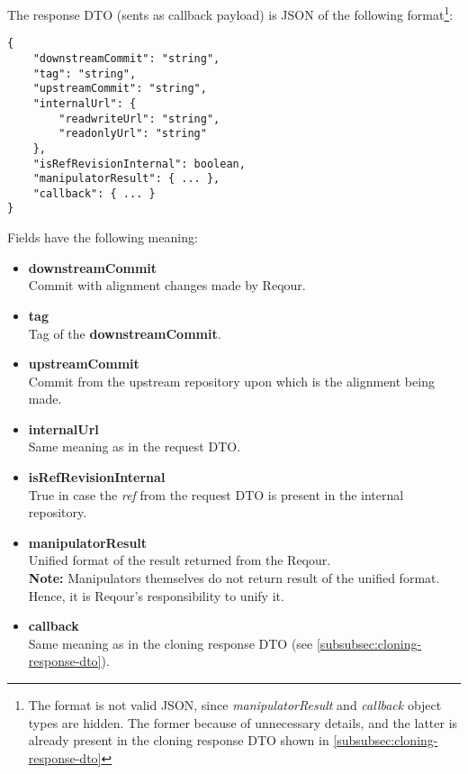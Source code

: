\documentclass[../main.tex]{subfiles}
\begin{document}
The response DTO (sents as callback payload) is JSON of the following format\footnote{The format is not valid JSON, since \textit{manipulatorResult} and \textit{callback} object types are hidden. The former because of unnecessary details, and the latter is already present in the cloning response DTO shown in \ref{subsubsec:cloning-response-dto}}:

\begin{lstlisting}[numbers=none]
{
    "downstreamCommit": "string",
    "tag": "string",
    "upstreamCommit": "string",
    "internalUrl": {
        "readwriteUrl": "string",
        "readonlyUrl": "string"
    },
    "isRefRevisionInternal": boolean,
    "manipulatorResult": { ... },
    "callback": { ... }
}
\end{lstlisting}

Fields have the following meaning:
\begin{itemize}
    \item \textbf{downstreamCommit}\\
    Commit with alignment changes made by Reqour.

    \item \textbf{tag}\\
    Tag of the \textbf{downstreamCommit}.

    \item \textbf{upstreamCommit}\\
    Commit from the upstream repository upon which is the alignment being made.
    
    \item \textbf{internalUrl}\\
    Same meaning as in the request DTO.

    \item \textbf{isRefRevisionInternal}\\
    True in case the \textit{ref} from the request DTO is present in the internal repository.

    \item \textbf{manipulatorResult}\\
    Unified format of the result returned from the Reqour.\\
    \textbf{Note:} Manipulators themselves do not return result of the unified format. Hence, it is Reqour's responsibility to unify it.

    \item \textbf{callback}\\
    Same meaning as in the cloning response DTO (see \ref{subsubsec:cloning-response-dto}).
\end{itemize}
\end{document}
